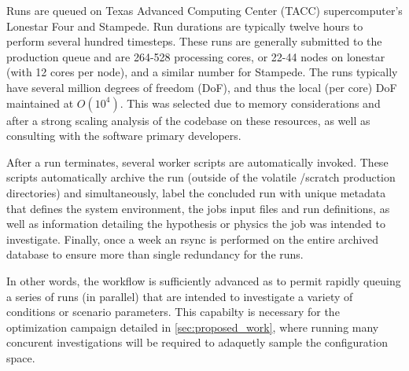 Runs are queued on Texas Advanced Computing Center (TACC)
supercomputer's Lonestar Four and Stampede. Run durations are typically  
twelve hours to perform several hundred timesteps. 
These runs are generally submitted to the production queue and are  
264-528 processing cores, 
or 22-44 nodes on lonestar (with 12 cores per node), and a similar number
for Stampede. The runs typically have several million degrees of freedom (DoF), 
and thus the local (per core) DoF maintained at $O(10^4)$. This was selected due to 
memory considerations and after a strong scaling analysis of the codebase on these 
resources, as well as consulting with the software primary developers. 

After a run terminates, several worker scripts are automatically invoked. 
These scripts automatically archive the run (outside of the volatile /scratch 
production directories) and simultaneously, label the concluded run with
unique metadata that defines the system environment, the jobs input
files and run definitions, as well as information detailing the
hypothesis or physics the job was intended to investigate. Finally, once
a week an rsync is performed on the entire archived database to ensure
more than single redundancy for the runs. 

In other words, the workflow is sufficiently advanced as to permit
rapidly queuing a series of runs (in parallel) that are intended to
investigate a variety of conditions or scenario parameters. This
capabilty is necessary for the optimization campaign detailed in
\ref{sec:proposed_work}, where running many concurent investigations
will be required to adaquetly sample the configuration space. 
